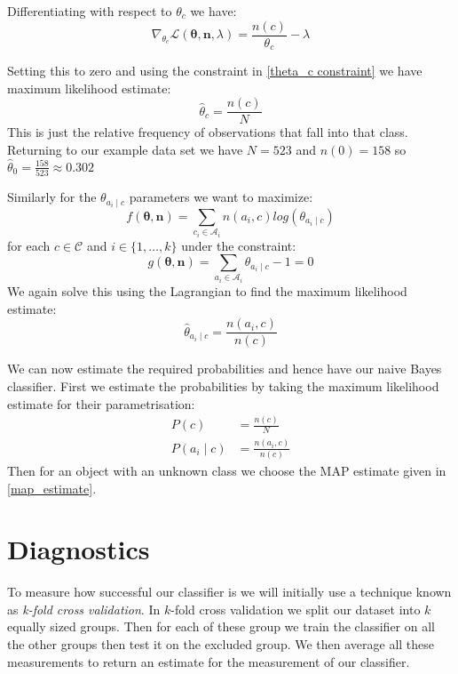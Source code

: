 Differentiating with respect to $\theta_c$ we have:
\begin{equation}
	\nabla_{\theta_c} \mathcal{L}(\mathbf{\theta}, \mathbf{n}, \lambda) = \frac{n(c)}{\theta_c} - \lambda
\end{equation}

Setting this to zero and using the constraint in \cref{theta_c constraint} we have maximum likelihood estimate:
\begin{equation}
	\hat\theta_c = \frac{n(c)}{N}
\end{equation}
This is just the relative frequency of observations that fall into that class.
Returning to our example data set we have $N=523$ and $n(0)=158$ so $\hat\theta_0 = \frac{158}{523} \approx 0.302$

Similarly for the $\theta_{a_i \mid c}$ parameters we want to maximize:
\begin{equation}
	f(\mathbf{\theta}, \mathbf{n}) = \sum_{c_i \in \mathcal{A}_i} n(a_i, c) log(\theta_{a_i \mid c})
\end{equation}
for each $c \in \mathcal{C}$ and $i \in \{1,\dots,k\}$ under the constraint:
\begin{equation}
	g(\mathbf{\theta}, \mathbf{n}) = \sum_{a_i \in \mathcal{A}_i}  \theta_{a_i \mid c} - 1 = 0
\end{equation}
We again solve this using the Lagrangian to find the maximum likelihood estimate:
\begin{equation}
	\hat\theta_{a_i \mid c} = \frac{n(a_i, c)}{n(c)}
\end{equation}

We can now estimate the required probabilities and hence have our naive Bayes classifier.
First we estimate the probabilities by taking the maximum likelihood estimate for their parametrisation:
\begin{align}
	P(c) & = \frac{n(c)}{N} \\
	P(a_i \mid c) & = \frac{n(a_i, c)}{n(c)}
\end{align}
Then for an object with an unknown class we choose the MAP estimate given in \cref{map_estimate}.

\section{Diagnostics}

To measure how successful our classifier is we will initially use a technique known as \textit{k-fold cross validation}.
In $k$-fold cross validation we split our dataset into $k$ equally sized groups.
Then for each of these group we train the classifier on all the other groups then test it on the excluded group.
We then average all these measurements to return an estimate for the measurement of our classifier.

